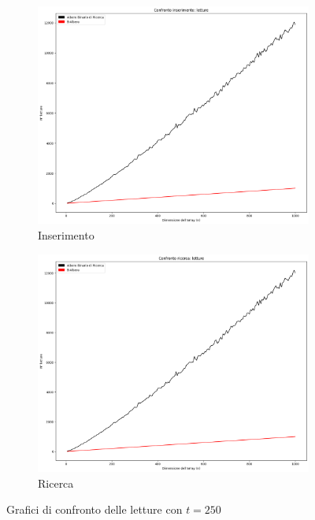 \begin{figure}[H]
    \centering
    \begin{subfigure}[b]{0.49\textwidth}
        \centering
        \includegraphics[width=\textwidth]{comparison-graphs/insert-r-t250.png}
        \caption{Inserimento}
        \label{fig:compgraphinsertread250}
    \end{subfigure}
    \hfill
    \begin{subfigure}[b]{0.49\textwidth}
        \centering
        \includegraphics[width=\textwidth]{comparison-graphs/search-r-t250.png}
        \caption{Ricerca}
        \label{fig:compgraphsearchread250}
    \end{subfigure}
    \caption{Grafici di confronto delle letture con $t=250$}
    \label{fig:compgraphread250}
\end{figure}

